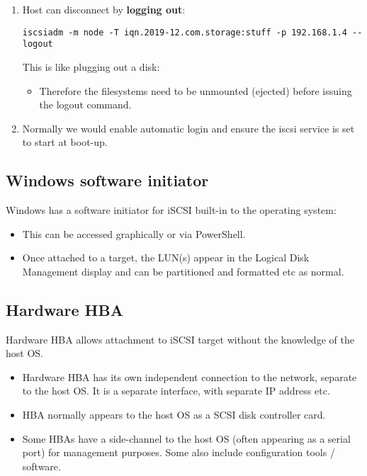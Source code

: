 \documentclass[slides]{pgnotes}
\begin{document}
\begin{enumerate}
  \newpage
\item
  Host can disconnect by \textbf{logging out}:

\begin{verbatim}
iscsiadm -m node -T iqn.2019-12.com.storage:stuff -p 192.168.1.4 --logout
\end{verbatim}

  This is like plugging out a disk:
  \begin{itemize}
  \item Therefore the filesystems need to be  unmounted (ejected) before issuing the logout command.
  \end{itemize}

\newpage
\item
  Normally we would enable automatic login and ensure the iscsi service
  is set to start at boot-up.
\end{enumerate}

\subsection{Windows software
initiator}\label{windows-software-initiator}

Windows has a software initiator for iSCSI built-in to the operating
system:
\begin{itemize}
\item This can be accessed graphically or via PowerShell.
\item Once attached to a target, the LUN(s) appear in the Logical Disk Management display and can be partitioned and formatted etc as normal.
\end{itemize}

\subsection{Hardware HBA}\label{hardware-hba}

Hardware HBA allows attachment to iSCSI target without the knowledge of
the host OS.

\begin{itemize}
\item
  Hardware HBA has its own independent connection to the network,
  separate to the host OS. It is a separate interface, with separate IP
  address etc.
\item
  HBA normally appears to the host OS as a SCSI disk controller card.
\item
  Some HBAs have a side-channel to the host OS (often appearing as a
  serial port) for management purposes. Some also include configuration
  tools / software.
\end{itemize}
\end{document}
